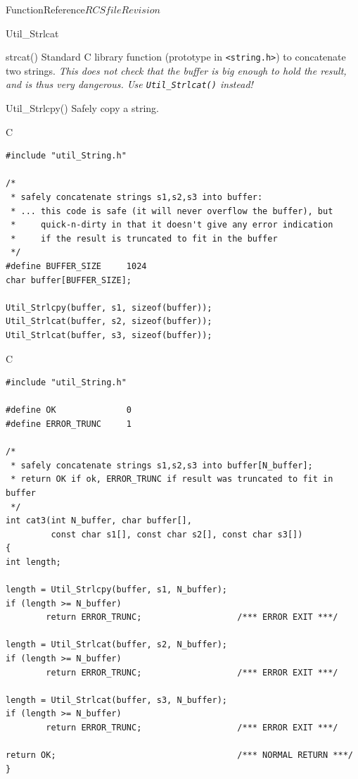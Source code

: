 \begin{cactuspart}{FunctionReference}{$RCSfile$}{$Revision$}
\begin{FunctionDescription}{Util\_Strlcat}
\begin{SeeAlsoSection}
\begin{SeeAlso}{strcat()}
Standard C library function (prototype in \verb|<string.h>|)
to concatenate two strings.
{\em This does not check that the buffer is big enough to hold the result,
and is thus very dangerous.  Use \verb|Util_Strlcat()| instead!}
\end{SeeAlso}
\begin{SeeAlso}{Util\_Strlcpy()}
Safely copy a string.
\end{SeeAlso}
\end{SeeAlsoSection}

\begin{ExampleSection}
\begin{Example}{C}
\begin{verbatim}
#include "util_String.h"

/*
 * safely concatenate strings s1,s2,s3 into buffer:
 * ... this code is safe (it will never overflow the buffer), but
 *     quick-n-dirty in that it doesn't give any error indication
 *     if the result is truncated to fit in the buffer
 */
#define BUFFER_SIZE     1024
char buffer[BUFFER_SIZE];

Util_Strlcpy(buffer, s1, sizeof(buffer));
Util_Strlcat(buffer, s2, sizeof(buffer));
Util_Strlcat(buffer, s3, sizeof(buffer));
\end{verbatim}
\end{Example}
\begin{Example}{C}
\begin{verbatim}
#include "util_String.h"

#define OK              0
#define ERROR_TRUNC     1

/*
 * safely concatenate strings s1,s2,s3 into buffer[N_buffer];
 * return OK if ok, ERROR_TRUNC if result was truncated to fit in buffer
 */
int cat3(int N_buffer, char buffer[],
         const char s1[], const char s2[], const char s3[])
{
int length;

length = Util_Strlcpy(buffer, s1, N_buffer);
if (length >= N_buffer)
        return ERROR_TRUNC;                   /*** ERROR EXIT ***/

length = Util_Strlcat(buffer, s2, N_buffer);
if (length >= N_buffer)
        return ERROR_TRUNC;                   /*** ERROR EXIT ***/

length = Util_Strlcat(buffer, s3, N_buffer);
if (length >= N_buffer)
        return ERROR_TRUNC;                   /*** ERROR EXIT ***/

return OK;                                    /*** NORMAL RETURN ***/
}
\end{verbatim}
\end{Example}
\end{ExampleSection}
\end{FunctionDescription}


\end{cactuspart}
